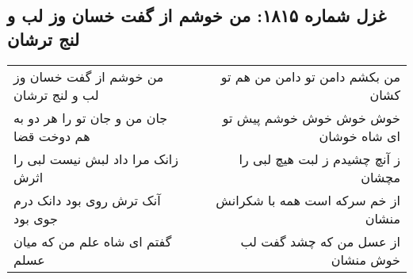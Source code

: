 \begin{center}
\section*{غزل شماره ۱۸۱۵: من خوشم از گفت خسان وز لب و لنج ترشان}
\label{sec:1815}
\begin{longtable}{l p{0.5cm} r}
من خوشم از گفت خسان وز لب و لنج ترشان
&&
من بکشم دامن تو دامن من هم تو کشان
\\
جان من و جان تو را هر دو به هم دوخت قضا
&&
خوش خوش خوش خوشم پیش تو ای شاه خوشان
\\
زانک مرا داد لبش نیست لبی را اثرش
&&
ز آنچ چشیدم ز لبت هیچ لبی را مچشان
\\
آنک ترش روی بود دانک درم جوی بود
&&
از خم سرکه است همه با شکرانش منشان
\\
گفتم ای شاه علم من که میان عسلم
&&
از عسل من که چشد گفت لب خوش منشان
\\
\end{longtable}
\end{center}
